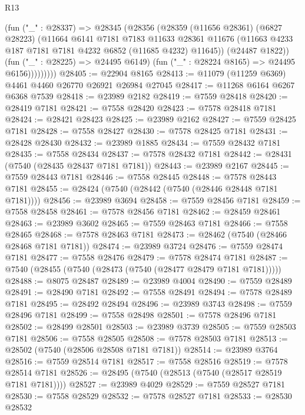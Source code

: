 \begin{lexlean}{R13}
\begin{coremodule}
                (fun ("_" : @28337) =>
                @28345
                  (@28356
                    (@28359
                      (@11656 @28361)
                      (@6827 @28223)
                      (@11664
                        @6141
                        @7181
                        @7183
                        @11633
                        @28361
                        @11676
                        (@11663 @4233 @187 @7181 @7181 @4232 @6852 (@11685 @4232) @11645))
                      (@24487 @1822))
                    (fun ("_" : @28225) => @24495 @6149)
                    (fun ("_" : @28224 @8165) => @24495 @6156)))))))))
@28405 := @22904 @8165
@28413 := @11079 (@11259 @6369) @4461 @4460 @26770 @26921 @26984 @27045
@28417 := @11268 @6164 @6267 @6368 @7539
@28418 := @23989 @2182
@28419 := @7559 @28418
@28420 := @28419 @7181
@28421 := @7558 @28420
@28423 := @7578 @28418 @7181
@28424 := @28421 @28423
@28425 := @23989 @2162
@28427 := @7559 @28425 @7181
@28428 := @7558 @28427
@28430 := @7578 @28425 @7181
@28431 := @28428 @28430
@28432 := @23989 @1885
@28434 := @7559 @28432 @7181
@28435 := @7558 @28434
@28437 := @7578 @28432 @7181
@28442 := @28431 (@7540 (@28435 @28437 @7181 @7181))
@28443 := @23989 @2167
@28445 := @7559 @28443 @7181
@28446 := @7558 @28445
@28448 := @7578 @28443 @7181
@28455 := @28424 (@7540 (@28442 (@7540 (@28446 @28448 @7181 @7181))))
@28456 := @23989 @3694
@28458 := @7559 @28456 @7181
@28459 := @7558 @28458
@28461 := @7578 @28456 @7181
@28462 := @28459 @28461
@28463 := @23989 @3602
@28465 := @7559 @28463 @7181
@28466 := @7558 @28465
@28468 := @7578 @28463 @7181
@28473 := @28462 (@7540 (@28466 @28468 @7181 @7181))
@28474 := @23989 @3724
@28476 := @7559 @28474 @7181
@28477 := @7558 @28476
@28479 := @7578 @28474 @7181
@28487 := @7540 (@28455 (@7540 (@28473 (@7540 (@28477 @28479 @7181 @7181)))))
@28488 := @8075 @28487
@28489 := @23989 @4004
@28490 := @7559 @28489
@28491 := @28490 @7181
@28492 := @7558 @28491
@28494 := @7578 @28489 @7181
@28495 := @28492 @28494
@28496 := @23989 @3743
@28498 := @7559 @28496 @7181
@28499 := @7558 @28498
@28501 := @7578 @28496 @7181
@28502 := @28499 @28501
@28503 := @23989 @3739
@28505 := @7559 @28503 @7181
@28506 := @7558 @28505
@28508 := @7578 @28503 @7181
@28513 := @28502 (@7540 (@28506 @28508 @7181 @7181))
@28514 := @23989 @3764
@28516 := @7559 @28514 @7181
@28517 := @7558 @28516
@28519 := @7578 @28514 @7181
@28526 := @28495 (@7540 (@28513 (@7540 (@28517 @28519 @7181 @7181))))
@28527 := @23989 @4029
@28529 := @7559 @28527 @7181
@28530 := @7558 @28529
@28532 := @7578 @28527 @7181
@28533 := @28530 @28532

\end{coremodule}
\end{lexlean}
